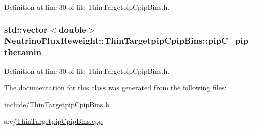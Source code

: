 Definition at line 30 of file Thin\-Targetpip\-Cpip\-Bins.\-h.

\hypertarget{class_neutrino_flux_reweight_1_1_thin_targetpip_cpip_bins_ab77cf82bfaa42b9b08dae91f4f1a0a0d}{
\subsubsection[{pip\-C\-\_\-pip\-\_\-thetamin}]{\setlength{\rightskip}{0pt plus 5cm}std\-::vector$<$double$>$ Neutrino\-Flux\-Reweight\-::\-Thin\-Targetpip\-Cpip\-Bins\-::pip\-C\-\_\-pip\-\_\-thetamin}}\label{class_neutrino_flux_reweight_1_1_thin_targetpip_cpip_bins_ab77cf82bfaa42b9b08dae91f4f1a0a0d}


Definition at line 30 of file Thin\-Targetpip\-Cpip\-Bins.\-h.



The documentation for this class was generated from the following files\-:\begin{DoxyCompactItemize}
\item 
include/\hyperlink{_thin_targetpip_cpip_bins_8h}{Thin\-Targetpip\-Cpip\-Bins.\-h}\item 
src/\hyperlink{_thin_targetpip_cpip_bins_8cpp}{Thin\-Targetpip\-Cpip\-Bins.\-cpp}\end{DoxyCompactItemize}
